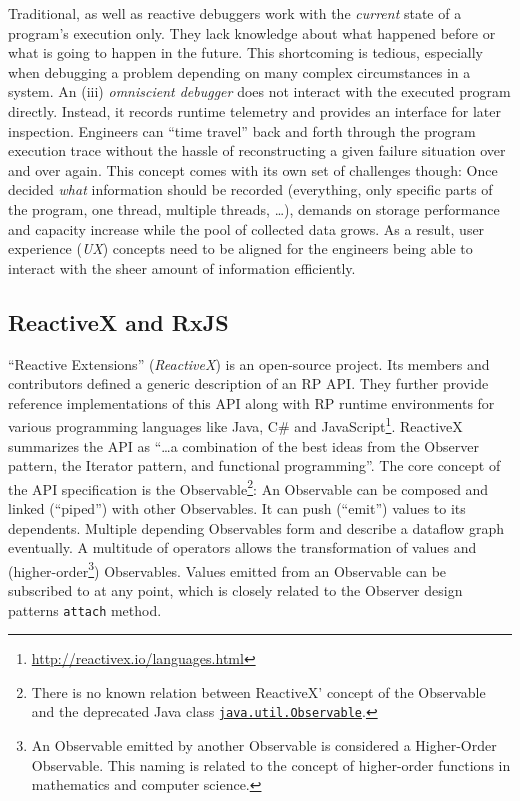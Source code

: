 \documentclass[12pt,a4paper]{article}
\begin{document}
Traditional, as well as reactive debuggers work with the \emph{current} state of a program's execution only. They lack knowledge about what happened before or what is going to happen in the future. This shortcoming is tedious, especially when debugging a problem depending on many complex circumstances in a system. An (iii) \emph{omniscient debugger} \cite{5287015} \cite{DBLP:journals/corr/OCallahanJFHNP17} does not interact with the executed program directly. Instead, it records runtime telemetry and provides an interface for later inspection. Engineers can ``time travel'' back and forth through the program execution trace without the hassle of reconstructing a given failure situation over and over again. This concept comes with its own set of challenges though: Once decided \emph{what} information should be recorded (everything, only specific parts of the program, one thread, multiple threads, \dots), demands on storage performance and capacity increase while the pool of collected data grows. As a result, user experience (\emph{UX}) concepts need to be aligned for the engineers being able to interact with the sheer amount\cite{5287015} of information efficiently.

\subsection{ReactiveX and RxJS}

``Reactive Extensions'' (\emph{ReactiveX}) is an open-source project. Its members and contributors defined a generic description of an RP API. They further provide reference implementations of this API along with RP runtime environments for various programming languages like Java, C\# and JavaScript\footnote{\url{http://reactivex.io/languages.html}}. ReactiveX summarizes the API as ``\dots a combination of the best ideas from the Observer pattern, the Iterator pattern, and functional programming''\cite{reactivex}. The core concept of the API specification is the Observable\footnote{There is no known relation between ReactiveX' concept of the Observable and the deprecated Java class \href{https://docs.oracle.com/en/java/javase/11/docs/api/java.base/java/util/Observable.html}{\texttt{java.util.Observable}}.}: An Observable can be composed and linked (``piped'') with other Observables. It can push (``emit'') values to its dependents. Multiple depending Observables form and describe a dataflow graph eventually. A multitude of operators allows the transformation of values and (higher-order\footnote{An Observable emitted by another Observable is considered a Higher-Order Observable. This naming is related to the concept of higher-order functions in mathematics and computer science.}) Observables. Values emitted from an Observable can be subscribed to at any point, which is closely related to the Observer design patterns \texttt{attach} method.
\end{document}

